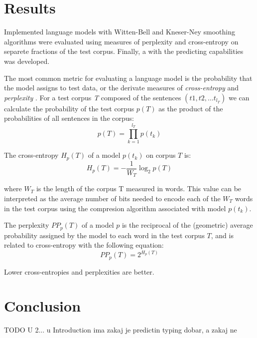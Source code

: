 \documentclass[twoside]{article}
\begin{document}
\begin{multicols}{2}
\section{Results}
Implemented language models with Witten-Bell and Kneser-Ney smoothing algorithms were evaluated using measures of perplexity and cross-entropy on separete fractions of the test corpus. Finally, a  with the predicting capabilities was developed.


The most common metric for evaluating a language model is the probability that the model assigns to test data, or the derivate measures of \textit{cross-entropy} and \textit{perplexity} \cite{1_chen1999empirical}. For a test corpus \textit{T} composed of the sentences $(t1, t2 , ... t_{l_{T}})$ we can calculate the probability of the test corpus $p(T)$ as the product of the probabilities of all sentences in the corpus:
\begin{equation}
p(T) = \prod_{k=1}^{l_{T}} p(t_{k})
\end{equation}

The cross-entropy $H_{p}(T)$ of a model $p(t_{k})$ on corpus $T$ is:
\begin{equation}
H_{p}(T) = - \frac{1}{W_{T}} \log_{2} p(T)
\end{equation}

where $W_{T}$ is the length of the corpus T measured in words. This value can be interpreted as the average number of bits needed to encode each of the $W_{T}$ words in the test corpus using the compresion algorithm associated with model $p(t_{k})$.

The perplexity $PP_{p}(T)$ of a model $p$ is the reciprocal of the (geometric) average probability assigned by the model to each word in the test corpus $T$, and is related to cross-entropy with the following equation:
\begin{equation}
PP_{p} (T) = 2^{H_{p}(T)}
\end{equation}

Lower cross-entropies and perplexities are better.


\section{Conclusion}
TODO U 2... u Introduction ima zakaj je predictin typing dobar, a zakaj ne


{}
\nocite{*}



\end{multicols}
\end{document}
